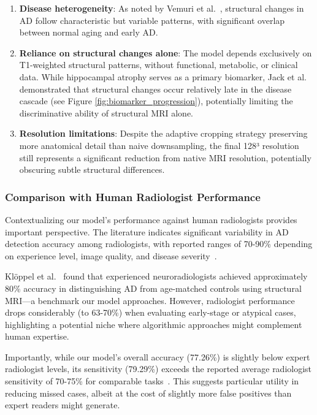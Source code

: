 \documentclass[12pt, a4paper]{article}
\begin{document}
\begin{enumerate}
    \item \textbf{Disease heterogeneity}: As noted by Vemuri et al.~\cite{vemuri2010role}, structural changes in AD follow characteristic but variable patterns, with significant overlap between normal aging and early AD.
    
    \item \textbf{Reliance on structural changes alone}: The model depends exclusively on T1-weighted structural patterns, without functional, metabolic, or clinical data. While hippocampal atrophy serves as a primary biomarker, Jack et al.~\cite{jack2013tracking} demonstrated that structural changes occur relatively late in the disease cascade (see Figure \ref{fig:biomarker_progression}), potentially limiting the discriminative ability of structural MRI alone.
    
    \item \textbf{Resolution limitations}: Despite the adaptive cropping strategy preserving more anatomical detail than naive downsampling, the final 128³ resolution still represents a significant reduction from native MRI resolution, potentially obscuring subtle structural differences.
\end{enumerate}

\subsubsection{Comparison with Human Radiologist Performance}

Contextualizing our model's performance against human radiologists provides important perspective. The literature indicates significant variability in AD detection accuracy among radiologists, with reported ranges of 70-90\% depending on experience level, image quality, and disease severity~\cite{kloppel2008accuracy, frisoni2010clinical}.

Klöppel et al.~\cite{kloppel2008accuracy} found that experienced neuroradiologists achieved approximately 80\% accuracy in distinguishing AD from age-matched controls using structural MRI—a benchmark our model approaches. However, radiologist performance drops considerably (to 63-70\%) when evaluating early-stage or atypical cases, highlighting a potential niche where algorithmic approaches might complement human expertise.

Importantly, while our model's overall accuracy (77.26\%) is slightly below expert radiologist levels, its sensitivity (79.29\%) exceeds the reported average radiologist sensitivity of 70-75\% for comparable tasks~\cite{frisoni2010clinical}. This suggests particular utility in reducing missed cases, albeit at the cost of slightly more false positives than expert readers might generate.
\end{document}

